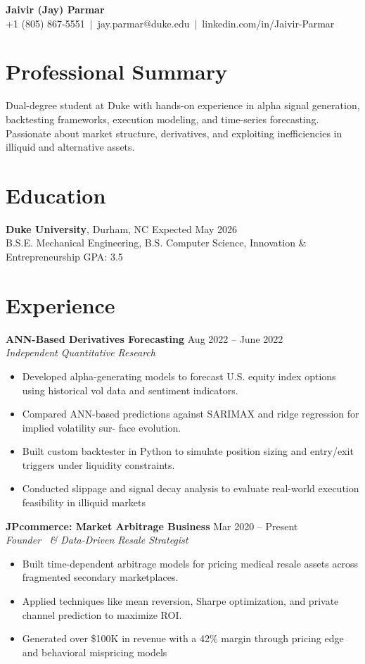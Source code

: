 \documentclass[11pt]{article}
\begin{document}
\begin{center}
    {\LARGE \textbf{Jaivir (Jay) Parmar}}\\[0.2cm]
    +1 (805) 867-5551 \,$\vert$\, jay.parmar@duke.edu \,$\vert$\, linkedin.com/in/Jaivir-Parmar
\end{center}

\section*{Professional Summary}
Dual-degree student at Duke with hands-on experience in alpha signal generation, backtesting frameworks,
execution modeling, and time-series forecasting. Passionate about market structure, derivatives, and
exploiting inefficiencies in illiquid and alternative assets.

\section*{Education}
\textbf{Duke University}, Durham, NC \hfill Expected May 2026\\
B.S.E. Mechanical Engineering, B.S. Computer Science, Innovation \& Entrepreneurship \hfill GPA: 3.5

\section*{Experience}

\textbf{ANN-Based Derivatives Forecasting} \hfill Aug 2022 -- June 2022\\
\textit{Independent Quantitative Research}
\begin{itemize}
\item Developed alpha-generating models to forecast U.S. equity index options using historical vol data
and sentiment indicators.
\item Compared ANN-based predictions against SARIMAX and ridge regression for implied volatility sur-
face evolution.
\item Built custom backtester in Python to simulate position sizing and entry/exit triggers under liquidity
constraints.
\item Conducted slippage and signal decay analysis to evaluate real-world execution feasibility in illiquid
markets
\end{itemize}


\textbf{JPcommerce: Market Arbitrage Business} \hfill Mar 2020 -- Present\\
\textit{Founder \, \& Data-Driven Resale Strategist}
\begin{itemize}
\item Built time-dependent arbitrage models for pricing medical resale assets across fragmented secondary
marketplaces.
\item Applied techniques like mean reversion, Sharpe optimization, and private channel prediction to
maximize ROI.
\item Generated over \$100K in revenue with a 42\% margin through pricing edge and behavioral mispricing
models
\end{itemize}
\end{document}
